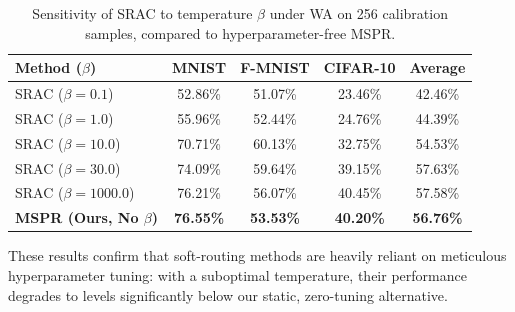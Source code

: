 \documentclass{article}
\theoremstyle{plain}
\theoremstyle{definition}
\theoremstyle{remark}
\begin{document}
\begin{table}[H]
\caption{Sensitivity of SRAC to temperature $\beta$ under WA on 256 calibration samples, compared to hyperparameter-free MSPR.}
\label{table-beta-sensitivity}
\vskip 0.05in
\begin{center}
\begin{footnotesize}
\setlength{\tabcolsep}{8pt}
\begin{tabular}{lcccc}
\toprule
Method ($\beta$) & MNIST & F-MNIST & CIFAR-10 & Average \\
\midrule
SRAC ($\beta=0.1$) & 52.86\% & 51.07\% & 23.46\% & 42.46\% \\
SRAC ($\beta=1.0$) & 55.96\% & 52.44\% & 24.76\% & 44.39\% \\
SRAC ($\beta=10.0$) & 70.71\% & 60.13\% & 32.75\% & 54.53\% \\
SRAC ($\beta=30.0$) & 74.09\% & 59.64\% & 39.15\% & 57.63\% \\
SRAC ($\beta=1000.0$) & 76.21\% & 56.07\% & 40.45\% & 57.58\% \\
\midrule
\textbf{MSPR (Ours, No $\beta$)} & \textbf{76.55\%} & \textbf{53.53\%} & \textbf{40.20\%} & \textbf{56.76\%} \\
\bottomrule
\end{tabular}
\end{footnotesize}
\end{center}
\vskip -0.15in
\end{table}

These results confirm that soft-routing methods are heavily reliant on meticulous hyperparameter tuning: with a suboptimal temperature, their performance degrades to levels significantly below our static, zero-tuning alternative.
\end{document}
